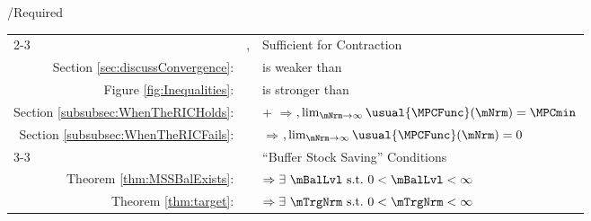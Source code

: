 \documentclass[\econtexRoot/BufferStockTheory]{subfiles}
\providecommand{\TblName}{}
\renewcommand{\TblName}{Required}
\begin{document}
\begin{verbatimwrite}{\TableDir/\TblName}
\begin{table}
{\begin{tabular}{|l|l|l|}
        \\ \cline{2-3}\multicolumn{1}{|r|}{Section \ref{subsec:contraction}:}                            & \FVAC, \WRIC                      & Sufficient for Contraction
        \\ \multicolumn{1}{|r|}{Section \ref{sec:discussConvergence}:}                               &                      & {\WRIC}{ is} weaker than \RIC 
        \\  \multicolumn{1}{|r|}{Figure \ref{fig:Inequalities}:}                                        &                                 & {\FVAC}{ is} stronger than \PFFVAC 
        \\ \multicolumn{1}{|r|}{Section \ref{subsubsec:WhenTheRICHolds}:}
                                                                                                                               &                                 & \cncl{\FHWC}+{\RIC} $\Rightarrow ${\GICRaw}$, \lim_{\mNrm \rightarrow \infty} \usual{\MPCFunc}(\mNrm)=\MPCmin$
        \\  \multicolumn{1}{|r|}{Section \ref{subsubsec:WhenTheRICFails}:}                                        &                                 & \cncl{\RIC}  $\Rightarrow $\cncl{\FHWC}$, \lim_{\mNrm \rightarrow \infty} \usual{\MPCFunc}(\mNrm)=0$
        \\ \cline{3-3}\multicolumn{1}{|r|}{Section \ref{subsec:onetarget}:}                                        &                                 & ``Buffer Stock Saving'' Conditions
        \\ \multicolumn{1}{|r|}{Theorem \ref{thm:MSSBalExists}:}                                        &                                 & \phantom{-Nrm}{\GICRaw} $\Rightarrow  \exists\phantom{~}\mBalLvl \phantom{~}\text{s.t.}\phantom{~} 0 < \mBalLvl < \infty$ %
        \\ \multicolumn{1}{|r|}{Theorem \ref{thm:target}:}                                        &                                 & {\GICMod} $\Rightarrow \exists \phantom{~} \mTrgNrm \phantom{~} \text{s.t.}\phantom{~} 0 < \mTrgNrm < \infty$ %
                                                                                                                           

\end{tabular}}
\end{table}
\end{verbatimwrite}
\end{document}
